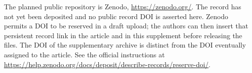 \documentclass[11pt]{article}
\begin{document}
The planned public repository is Zenodo, \url{https://zenodo.org/}.
The record has not yet been deposited and no public record DOI is
asserted here. Zenodo permits a DOI to be reserved in a draft upload;
the authors can then insert that persistent record link in the
article and in this supplement before releasing the files. The DOI
of the supplementary archive is distinct from the DOI eventually
assigned to the article. See the official instructions at
\url{https://help.zenodo.org/docs/deposit/describe-records/reserve-doi/}.
\end{document}
